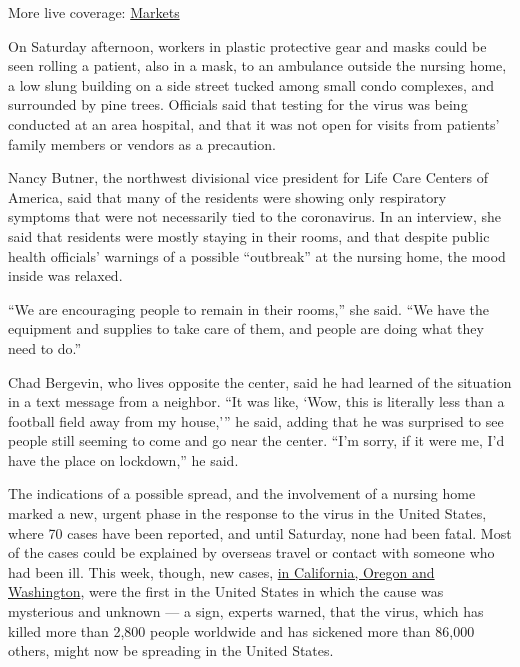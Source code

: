 More live coverage:
\href{https://www.nytimes3xbfgragh.onion/live/2020/08/20/business/stock-market-today-coronavirus?action=click\&pgtype=Article\&state=default\&region=MAIN_CONTENT_1\&context=storylines_live_updates}{Markets}

On Saturday afternoon, workers in plastic protective gear and masks
could be seen rolling a patient, also in a mask, to an ambulance outside
the nursing home, a low slung building on a side street tucked among
small condo complexes, and surrounded by pine trees. Officials said that
testing for the virus was being conducted at an area hospital, and that
it was not open for visits from patients' family members or vendors as a
precaution.

Nancy Butner, the northwest divisional vice president for Life Care
Centers of America, said that many of the residents were showing only
respiratory symptoms that were not necessarily tied to the coronavirus.
In an interview, she said that residents were mostly staying in their
rooms, and that despite public health officials' warnings of a possible
``outbreak'' at the nursing home, the mood inside was relaxed.

``We are encouraging people to remain in their rooms,'' she said. ``We
have the equipment and supplies to take care of them, and people are
doing what they need to do.''

Chad Bergevin, who lives opposite the center, said he had learned of the
situation in a text message from a neighbor. ``It was like, `Wow, this
is literally less than a football field away from my house,''' he said,
adding that he was surprised to see people still seeming to come and go
near the center. ``I'm sorry, if it were me, I'd have the place on
lockdown,'' he said.

The indications of a possible spread, and the involvement of a nursing
home marked a new, urgent phase in the response to the virus in the
United States, where 70 cases have been reported, and until Saturday,
none had been fatal. Most of the cases could be explained by overseas
travel or contact with someone who had been ill. This week, though, new
cases,
\href{https://www.nytimes3xbfgragh.onion/2020/02/28/us/coronavirus-solano-county.html}{in
California, Oregon and Washington}, were the first in the United States
in which the cause was mysterious and unknown --- a sign, experts
warned, that the virus, which has killed more than 2,800 people
worldwide and has sickened more than 86,000 others, might now be
spreading in the United States.

